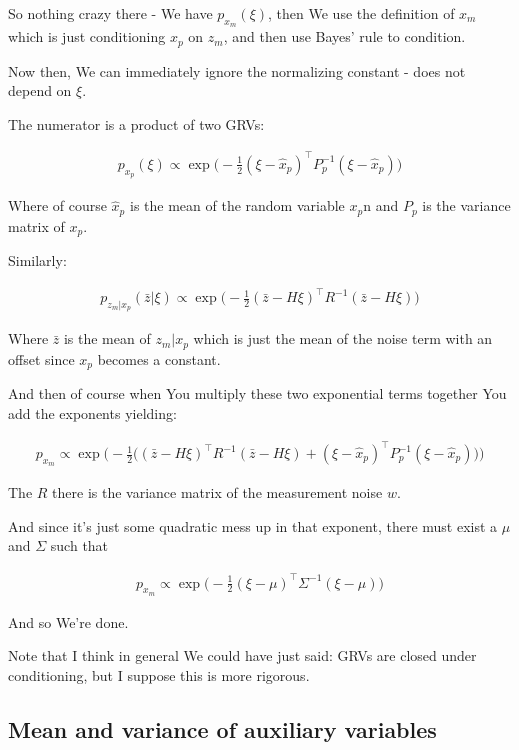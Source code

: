 \documentclass{article}
\begin{document}
		So nothing crazy there - We have $p_{x_m}(\xi)$, then We use the definition of $x_m$ which is just conditioning $x_p$ on $z_m$, and then use Bayes' rule to condition.
		
		Now then, We can immediately ignore the normalizing constant - does not depend on $\xi$. 
		
		The numerator is a product of two GRVs:
		
		\begin{align}
			p_{x_p}(\xi) \propto \exp\bigg( -\frac{1}{2}(\xi - \hat{x}_p)^\top P^{-1}_p (\xi - \hat{x}_p) \bigg)
		\end{align}
		
		Where of course $\hat{x}_p$ is the mean of the random variable $x_p$n and $P_p$ is the variance matrix of $x_p$.
		
		Similarly:
		
		\begin{align}
			p_{z_m|x_p}(\bar{z}|\xi) \propto \exp\bigg( -\frac{1}{2}(\bar{z} - H\xi)^\top R^{-1} (\bar{z}-H\xi) \bigg)
		\end{align}
		
		Where $\bar{z}$ is the mean of $z_m|x_p$ which is just the mean of the noise term with an offset since $x_p$ becomes a constant.
		
		And then of course when You multiply these two exponential terms together You add the exponents yielding:
		
		\begin{align}
			p_{x_m} \propto \exp\bigg( -\frac{1}{2}\bigg( (\bar{z} - H\xi)^\top R^{-1} (\bar{z}-H\xi) + (\xi - \hat{x}_p)^\top P^{-1}_p (\xi - \hat{x}_p) \bigg) \bigg)
		\end{align}
		
		The $R$ there is the variance matrix of the measurement noise $w$.
		
		And since it's just some quadratic mess up in that exponent, there must exist a $\mu$ and $\Sigma$ such that
		
		\begin{align}
			p_{x_m} \propto \exp\bigg( -\frac{1}{2} (\xi - \mu)^\top \Sigma^{-1} (\xi - \mu)\bigg)
		\end{align}
		
		And so We're done.
		
		Note that I think in general We could have just said: GRVs are closed under conditioning, but I suppose this is more rigorous.
		
	\subsection{Mean and variance of auxiliary variables}
	
\end{document}
